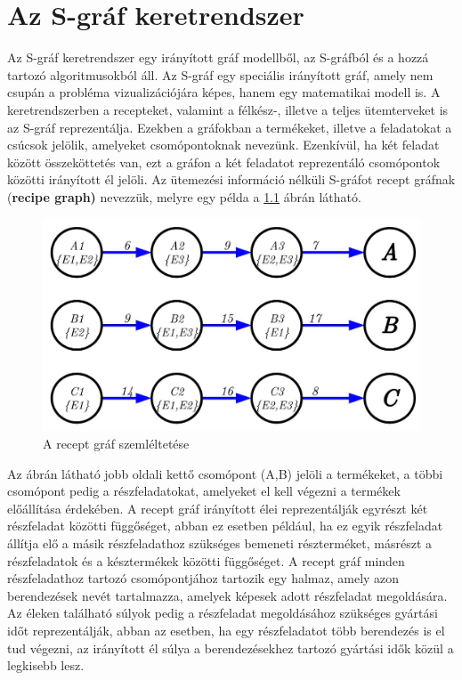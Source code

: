 \chapter{Az S-gráf keretrendszer} \label{S-graph}
Az S-gráf keretrendszer egy irányított gráf modellből, az S-gráfból és a hozzá tartozó algoritmusokból áll. \cite{SANMARTI1998S847}
Az S-gráf egy speciális irányított gráf, amely nem csupán a probléma vizualizációjára képes, hanem egy matematikai modell is.
A keretrendszerben a recepteket, valamint a félkész-, illetve a teljes ütemterveket is az S-gráf reprezentálja.
Ezekben a gráfokban a termékeket, illetve a feladatokat a csúcsok jelölik, amelyeket csomópontoknak nevezünk.
Ezenkívül, ha két feladat között összeköttetés van, ezt a gráfon a két feladatot reprezentáló csomópontok közötti irányított él jelöli.
Az ütemezési információ nélküli S-gráfot recept gráfnak (\textbf{recipe graph)} nevezzük, melyre egy példa a \ref{recipeGraph} ábrán látható.
\begin{figure}[H]
\begin{center}
\includegraphics[scale=0.375]{recipeGraph}
\caption{A recept gráf szemléltetése}
\label{recipeGraph}
\end{center}
\end{figure}
Az ábrán látható jobb oldali kettő csomópont (A,B) jelöli a termékeket, a többi csomópont pedig a részfeladatokat, amelyeket el kell végezni a termékek előállítása érdekében.
A recept gráf irányított élei reprezentálják egyrészt két részfeladat közötti függőséget, abban ez esetben például, ha ez egyik részfeladat állítja elő a másik részfeladathoz szükséges bemeneti részterméket, másrészt a részfeladatok és a késztermékek közötti függőséget.
A recept gráf minden részfeladathoz tartozó csomópontjához tartozik egy halmaz, amely azon berendezések nevét tartalmazza, amelyek képesek adott részfeladat megoldására.
Az éleken található súlyok pedig a részfeladat megoldásához szükséges gyártási időt reprezentálják, abban az esetben, ha egy részfeladatot több berendezés is el tud végezni, az irányított él súlya a berendezésekhez tartozó gyártási idők közül a legkisebb lesz.

